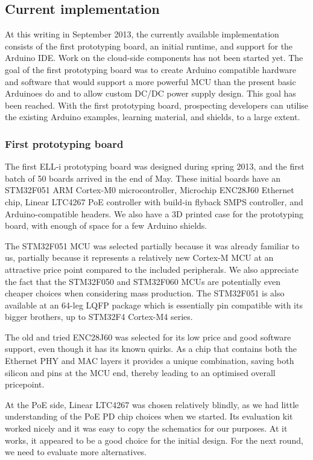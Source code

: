 \documentclass[draft,a4paper]{siamltex}
\begin{document}
\subsection{Current implementation}

At this writing in September 2013, the currently available
implementation consists of the first prototyping board, an initial
runtime, and support for the Arduino IDE.  Work on the cloud-side
components has not been started yet.
The goal of the first prototyping board was to create Arduino
compatible hardware and software that would support a more powerful
MCU than the present basic Arduinoes do and to allow custom DC/DC
power supply design.  This goal has been reached.  With the first
prototyping board, prospecting developers can utilise the existing
Arduino examples, learning material, and shields, to a large extent.

\subsubsection{First prototyping board}

The first ELL-i prototyping board was designed during spring 2013, and
the first batch of 50 boards arrived in the end of May.  These initial
boards have an STM32F051\cite{STM32F051} ARM Cortex-M0
microcontroller, Microchip ENC28J60\cite{ENC28J60} Ethernet chip,
Linear LTC4267 PoE controller with build-in flyback SMPS controller,
and Arduino-compatible headers.  We also have a 3D printed case for
the prototyping board, with enough of space for a few Arduino shields.

The STM32F051 MCU was selected partially because it was already
familiar to us, partially because it represents a relatively new
Cortex-M MCU at an attractive price point compared to the included
peripherals.  We also appreciate the fact that the STM32F050 and
STM32F060 MCUs are potentially even cheaper choices when considering
mass production.  The STM32F051 is also available at an 64-leg LQFP
package which is essentially pin compatible with its bigger brothers,
up to STM32F4 Cortex-M4 series.

The old and tried ENC28J60 was selected for its low price and good
software support, even though it has its known quirks.  As a chip that
contains both the Ethernet PHY and MAC layers it provides a unique
combination, saving both silicon and pins at the MCU end, thereby
leading to an optimised overall pricepoint.

At the PoE side, Linear LTC4267 was chosen relatively blindly, as we
had little understanding of the PoE PD chip choices when we started.
Its evaluation kit worked nicely and it was easy to copy the
schematics for our purposes.  At it works, it appeared to be a good
choice for the initial design.  For the next round, we need to
evaluate more alternatives.
\end{document}
